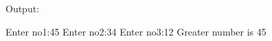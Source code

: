\begin{flushleft}
	Output:
	\begin{tcolorbox}[breakable,notitle,boxrule=-0pt,colback=output,colframe=output]
		\color{black}
		Enter no1:45 \newline
		Enter no2:34 \newline
		Enter no3:12 \newline
		Greater number is 45
		\font=4pt
	\end{tcolorbox}
	
	
	
	
	
\end{flushleft}

\newpage

